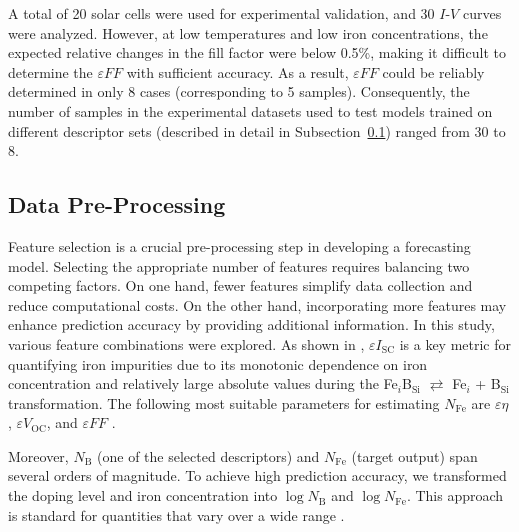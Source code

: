 \documentclass[a4paper,fleqn]{cas-sc}
\begin{document}
A total of 20 solar cells were used for experimental validation, and 30 $I$-$V$ curves were analyzed.
However, at low temperatures and low iron concentrations,
the expected relative changes in the fill factor were below 0.5\%,
making it difficult to determine the $\varepsilon F\!F$ with sufficient accuracy.
As a result, $\varepsilon F\!F$ could be reliably determined in only 8 cases (corresponding to 5 samples).
Consequently, the number of samples in the experimental datasets used to test models trained on different descriptor sets
(described in detail in Subsection~\ref{SecDPP}) ranged from 30 to 8.


\subsection{Data Pre-Processing}\label{SecDPP}

Feature selection is a crucial pre-processing step in developing a forecasting model.
Selecting the appropriate number of features requires balancing two competing factors.
On one hand, fewer features simplify data collection and reduce computational costs.
On the other hand, incorporating more features may enhance prediction accuracy by providing additional information.
In this study, various feature combinations were explored.
As shown in \cite{Olikh2025MSEB}, $\varepsilon I_\mathrm{SC}$ is a key metric for quantifying iron impurities
due to its monotonic dependence on iron concentration and relatively large absolute values during the
Fe$_i$B$_\mathrm{Si}$ $\rightleftarrows$ Fe$_i$ + B$_\mathrm{Si}$
transformation.
The following most suitable parameters for estimating $N_\mathrm{Fe}$ are
$\varepsilon \eta$, $\varepsilon V_\mathrm{OC}$, and $\varepsilon F\!F$ \cite{Olikh2025MSEB}.

Moreover, $N_\mathrm{B}$ (one of the selected descriptors) and
$N_\mathrm{Fe}$ (target output) span several orders of magnitude.
To achieve high prediction accuracy, we transformed the doping level and iron concentration into
$\log N_\mathrm{B}$ and $\log N_\mathrm{Fe}$.
This approach is standard for quantities that vary over a wide range \cite{Srivastava2023, Minagawa2024}.
\end{document}
